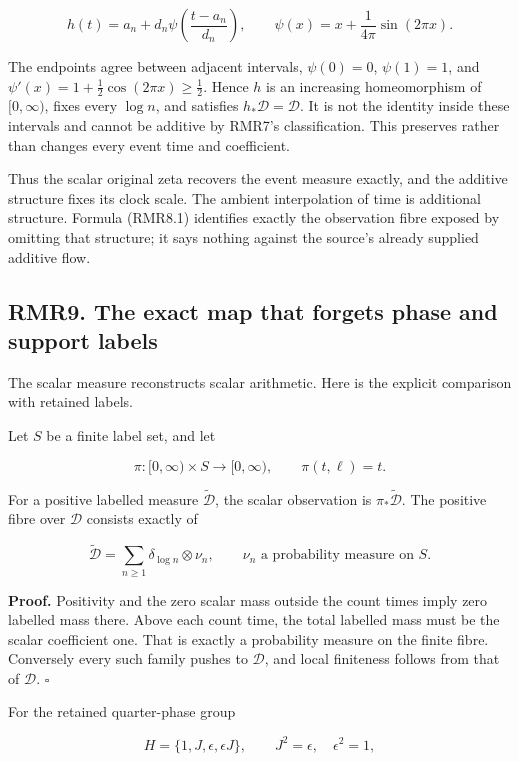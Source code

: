 \documentclass[
]{article}
\begin{document}
\[
h(t)=a_n+d_n\psi\left(\frac{t-a_n}{d_n}\right),
\qquad
\psi(x)=x+\frac{1}{4\pi}\sin(2\pi x).
\tag{RMR8.1}
\]

The endpoints agree between adjacent intervals, \(\psi(0)=0\),
\(\psi(1)=1\), and \(\psi'(x)=1+\tfrac12\cos(2\pi x)\ge\tfrac12\). Hence
\(h\) is an increasing homeomorphism of \([0,\infty)\), fixes every
\(\log n\), and satisfies \(h_*\mathcal D=\mathcal D\). It is not the
identity inside these intervals and cannot be additive by RMR7's
classification. This preserves rather than changes every event time and
coefficient.

Thus the scalar original zeta recovers the event measure exactly, and
the additive structure fixes its clock scale. The ambient interpolation
of time is additional structure. Formula (RMR8.1) identifies exactly the
observation fibre exposed by omitting that structure; it says nothing
against the source's already supplied additive flow.

\subsection{RMR9. The exact map that forgets phase and support
labels}\label{rmr9.-the-exact-map-that-forgets-phase-and-support-labels}

The scalar measure reconstructs scalar arithmetic. Here is the explicit
comparison with retained labels.

Let \(S\) be a finite label set, and let

\[
\pi:[0,\infty)\times S\longrightarrow[0,\infty),\qquad
\pi(t,\ell)=t.
\tag{RMR9.1}
\]

For a positive labelled measure \(\widetilde{\mathcal D}\), the scalar
observation is \(\pi_*\widetilde{\mathcal D}\). The positive fibre over
\(\mathcal D\) consists exactly of

\[
\widetilde{\mathcal D}
=\sum_{n\ge1}\delta_{\log n}\otimes\nu_n,
\qquad
\nu_n\text{ a probability measure on }S.
\tag{RMR9.2}
\]

\textbf{Proof.} Positivity and the zero scalar mass outside the count
times imply zero labelled mass there. Above each count time, the total
labelled mass must be the scalar coefficient one. That is exactly a
probability measure on the finite fibre. Conversely every such family
pushes to \(\mathcal D\), and local finiteness follows from that of
\(\mathcal D\). \(\square\)

For the retained quarter-phase group

\[
H=\{1,J,\epsilon,\epsilon J\},\qquad
J^2=\epsilon,\quad \epsilon^2=1,
\]
\end{document}

